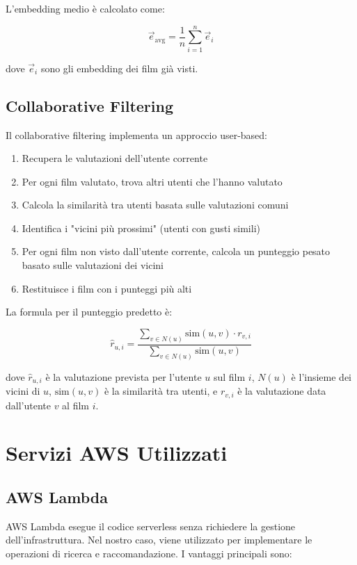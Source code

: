 \documentclass[11pt,a4paper]{article}
\begin{document}
L'embedding medio è calcolato come:

\begin{equation}
\vec{e}_{\text{avg}} = \frac{1}{n} \sum_{i=1}^{n} \vec{e}_i
\end{equation}

dove $\vec{e}_i$ sono gli embedding dei film già visti.

\subsection{Collaborative Filtering}
Il collaborative filtering implementa un approccio user-based:

\begin{enumerate}
  \item Recupera le valutazioni dell'utente corrente
  \item Per ogni film valutato, trova altri utenti che l'hanno valutato
  \item Calcola la similarità tra utenti basata sulle valutazioni comuni
  \item Identifica i "vicini più prossimi" (utenti con gusti simili)
  \item Per ogni film non visto dall'utente corrente, calcola un punteggio pesato basato sulle valutazioni dei vicini
  \item Restituisce i film con i punteggi più alti
\end{enumerate}

La formula per il punteggio predetto è:

\begin{equation}
\hat{r}_{u,i} = \frac{\sum_{v \in N(u)} \text{sim}(u,v) \cdot r_{v,i}}{\sum_{v \in N(u)} \text{sim}(u,v)}
\end{equation}

dove $\hat{r}_{u,i}$ è la valutazione prevista per l'utente $u$ sul film $i$, $N(u)$ è l'insieme dei vicini di $u$, $\text{sim}(u,v)$ è la similarità tra utenti, e $r_{v,i}$ è la valutazione data dall'utente $v$ al film $i$.

\section{Servizi AWS Utilizzati}
\subsection{AWS Lambda}
AWS Lambda esegue il codice serverless senza richiedere la gestione dell'infrastruttura. Nel nostro caso, viene utilizzato per implementare le operazioni di ricerca e raccomandazione. I vantaggi principali sono:
\end{document}
